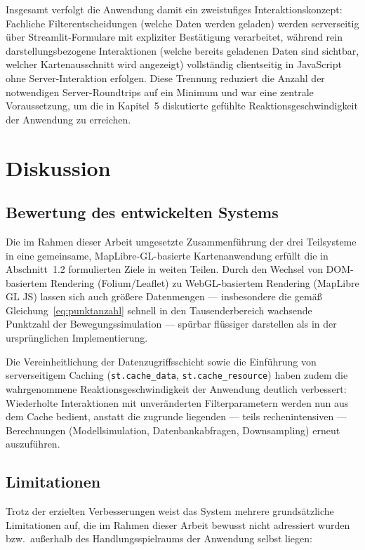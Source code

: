\documentclass[12pt,a4paper]{report}
\begin{document}
Insgesamt verfolgt die Anwendung damit ein zweistufiges Interaktionskonzept: Fachliche Filterentscheidungen (welche Daten werden geladen) werden serverseitig über Streamlit-Formulare mit expliziter Bestätigung verarbeitet, während rein darstellungsbezogene Interaktionen (welche bereits geladenen Daten sind sichtbar, welcher Kartenausschnitt wird angezeigt) vollständig clientseitig in JavaScript ohne Server-Interaktion erfolgen. Diese Trennung reduziert die Anzahl der notwendigen Server-Roundtrips auf ein Minimum und war eine zentrale Voraussetzung, um die in Kapitel~5 diskutierte gefühlte Reaktionsgeschwindigkeit der Anwendung zu erreichen.

\chapter{Diskussion}

\section{Bewertung des entwickelten Systems}

Die im Rahmen dieser Arbeit umgesetzte Zusammenführung der drei Teilsysteme in eine gemeinsame, MapLibre-GL-basierte Kartenanwendung erfüllt die in Abschnitt~1.2 formulierten Ziele in weiten Teilen. Durch den Wechsel von DOM-basiertem Rendering (Folium/Leaflet) zu WebGL-basiertem Rendering (MapLibre GL JS) lassen sich auch größere Datenmengen — insbesondere die gemäß Gleichung~\eqref{eq:punktanzahl} schnell in den Tausenderbereich wachsende Punktzahl der Bewegungssimulation — spürbar flüssiger darstellen als in der ursprünglichen Implementierung.

Die Vereinheitlichung der Datenzugriffsschicht sowie die Einführung von serverseitigem Caching (\texttt{st.cache\_data}, \texttt{st.cache\_resource}) haben zudem die wahrgenommene Reaktionsgeschwindigkeit der Anwendung deutlich verbessert: Wiederholte Interaktionen mit unveränderten Filterparametern werden nun aus dem Cache bedient, anstatt die zugrunde liegenden — teils rechenintensiven — Berechnungen (Modellsimulation, Datenbankabfragen, Downsampling) erneut auszuführen.

\section{Limitationen}

Trotz der erzielten Verbesserungen weist das System mehrere grundsätzliche Limitationen auf, die im Rahmen dieser Arbeit bewusst nicht adressiert wurden bzw.\ außerhalb des Handlungsspielraums der Anwendung selbst liegen:
\end{document}
